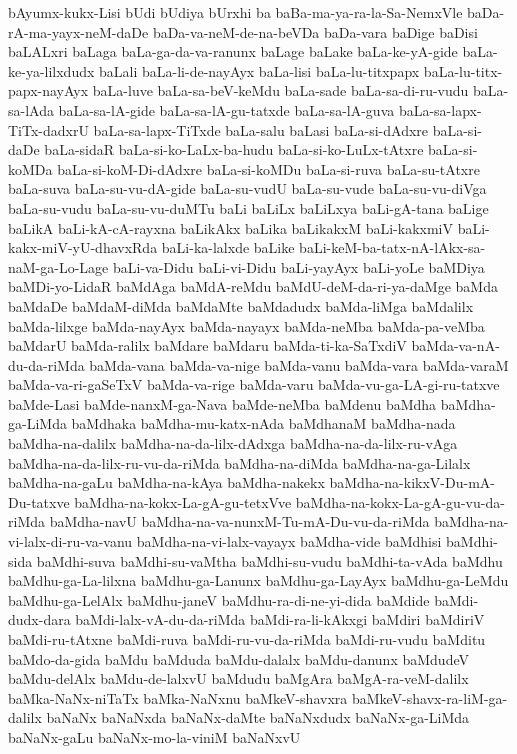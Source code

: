 {bAyumx-kukx-Lisi
bUdi
bUdiya
bUrxhi
ba
baBa-ma-ya-ra-la-Sa-NemxVle
baDa-rA-ma-yayx-neM-daDe
baDa-va-neM-de-na-beVDa
baDa-vara
baDige
baDisi
baLALxri
baLaga
baLa-ga-da-va-ranunx
baLage
baLake
baLa-ke-yA-gide
baLa-ke-ya-lilxdudx
baLali
baLa-li-de-nayAyx
baLa-lisi
baLa-lu-titxpapx
baLa-lu-titx-papx-nayAyx
baLa-luve
baLa-sa-beV-keMdu
baLa-sade
baLa-sa-di-ru-vudu
baLa-sa-lAda
baLa-sa-lA-gide
baLa-sa-lA-gu-tatxde
baLa-sa-lA-guva
baLa-sa-lapx-TiTx-dadxrU
baLa-sa-lapx-TiTxde
baLa-salu
baLasi
baLa-si-dAdxre
baLa-si-daDe
baLa-sidaR
baLa-si-ko-LaLx-ba-hudu
baLa-si-ko-LuLx-tAtxre
baLa-si-koMDa
baLa-si-koM-Di-dAdxre
baLa-si-koMDu
baLa-si-ruva
baLa-su-tAtxre
baLa-suva
baLa-su-vu-dA-gide
baLa-su-vudU
baLa-su-vude
baLa-su-vu-diVga
baLa-su-vudu
baLa-su-vu-duMTu
baLi
baLiLx
baLiLxya
baLi-gA-tana
baLige
baLikA
baLi-kA-cA-rayxna
baLikAkx
baLika
baLikakxM
baLi-kakxmiV
baLi-kakx-miV-yU-dhavxRda
baLi-ka-lalxde
baLike
baLi-keM-ba-tatx-nA-lAkx-sa-naM-ga-Lo-Lage
baLi-va-Didu
baLi-vi-Didu
baLi-yayAyx
baLi-yoLe
baMDiya
baMDi-yo-LidaR
baMdAga
baMdA-reMdu
baMdU-deM-da-ri-ya-daMge
baMda
baMdaDe
baMdaM-diMda
baMdaMte
baMdadudx
baMda-liMga
baMdalilx
baMda-lilxge
baMda-nayAyx
baMda-nayayx
baMda-neMba
baMda-pa-veMba
baMdarU
baMda-ralilx
baMdare
baMdaru
baMda-ti-ka-SaTxdiV
baMda-va-nA-du-da-riMda
baMda-vana
baMda-va-nige
baMda-vanu
baMda-vara
baMda-varaM
baMda-va-ri-gaSeTxV
baMda-va-rige
baMda-varu
baMda-vu-ga-LA-gi-ru-tatxve
baMde-Lasi
baMde-nanxM-ga-Nava
baMde-neMba
baMdenu
baMdha
baMdha-ga-LiMda
baMdhaka
baMdha-mu-katx-nAda
baMdhanaM
baMdha-nada
baMdha-na-dalilx
baMdha-na-da-lilx-dAdxga
baMdha-na-da-lilx-ru-vAga
baMdha-na-da-lilx-ru-vu-da-riMda
baMdha-na-diMda
baMdha-na-ga-Lilalx
baMdha-na-gaLu
baMdha-na-kAya
baMdha-nakekx
baMdha-na-kikxV-Du-mA-Du-tatxve
baMdha-na-kokx-La-gA-gu-tetxVve
baMdha-na-kokx-La-gA-gu-vu-da-riMda
baMdha-navU
baMdha-na-va-nunxM-Tu-mA-Du-vu-da-riMda
baMdha-na-vi-lalx-di-ru-va-vanu
baMdha-na-vi-lalx-vayayx
baMdha-vide
baMdhisi
baMdhi-sida
baMdhi-suva
baMdhi-su-vaMtha
baMdhi-su-vudu
baMdhi-ta-vAda
baMdhu
baMdhu-ga-La-lilxna
baMdhu-ga-Lanunx
baMdhu-ga-LayAyx
baMdhu-ga-LeMdu
baMdhu-ga-LelAlx
baMdhu-janeV
baMdhu-ra-di-ne-yi-dida
baMdide
baMdi-dudx-dara
baMdi-lalx-vA-du-da-riMda
baMdi-ra-li-kAkxgi
baMdiri
baMdiriV
baMdi-ru-tAtxne
baMdi-ruva
baMdi-ru-vu-da-riMda
baMdi-ru-vudu
baMditu
baMdo-da-gida
baMdu
baMduda
baMdu-dalalx
baMdu-danunx
baMdudeV
baMdu-delAlx
baMdu-de-lalxvU
baMdudu
baMgAra
baMgA-ra-veM-dalilx
baMka-NaNx-niTaTx
baMka-NaNxnu
baMkeV-shavxra
baMkeV-shavx-ra-liM-ga-dalilx
baNaNx
baNaNxda
baNaNx-daMte
baNaNxdudx
baNaNx-ga-LiMda
baNaNx-gaLu
baNaNx-mo-la-viniM
baNaNxvU
}
